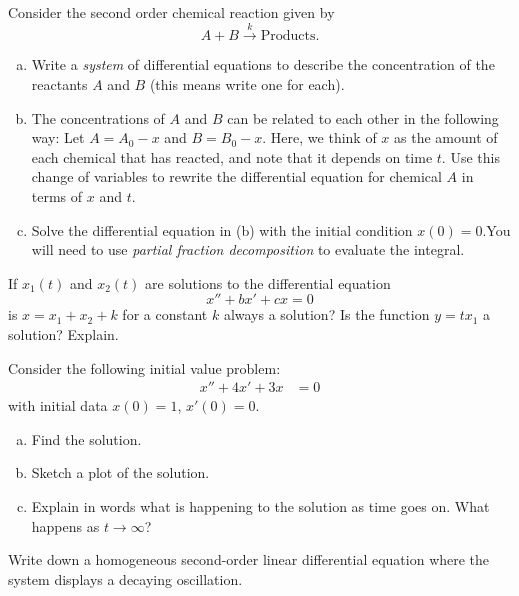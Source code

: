 \documentclass[12pt]{article} %
\begin{document}
\begin{problem}
Consider the second order chemical reaction given by
\[
A+B \xrightarrow{k} \textrm{Products}.
\]
\begin{enumerate}[(a)]
    \item Write a \emph{system} of differential equations to describe the concentration of the reactants $A$ and $B$ (this means write one for each).
    \item The concentrations of $A$ and $B$ can be related to each other in the following way: Let $A=A_0-x$ and $B=B_0-x$. Here, we think of $x$ as the amount of each chemical that has reacted, and note that it depends on time $t$. Use this change of variables to rewrite the differential equation for chemical $A$ in terms of $x$ and $t$.
    \item Solve the differential equation in (b) with the initial condition $x(0)=0$.You will need to use \emph{partial fraction decomposition} to evaluate the integral.
\end{enumerate}
\end{problem}

\begin{problem}
If $x_1(t)$ and $x_2(t)$ are solutions to the differential equation
\[
x'' + bx' +cx = 0
\]
is $x=x_1+x_2+k$ for a constant $k$ always a solution? Is the function $y=tx_1$ a solution? Explain.
\end{problem}


\begin{problem}
Consider the following initial value problem:
\begin{align*}
    x''+4x'+3x&=0
\end{align*}
with initial data $x(0)=1$, $x'(0)=0$.  
\begin{enumerate}[(a)]
    \item Find the solution.
    \item Sketch a plot of the solution.
    \item Explain in words what is happening to the solution as time goes on. What happens as $t\to \infty$?
\end{enumerate}
\end{problem}

\begin{problem}
Write down a homogeneous second-order linear differential equation where the system displays a decaying oscillation.
\end{problem}
\end{document}
